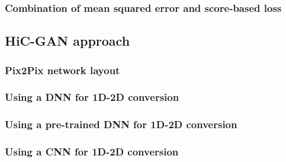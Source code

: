 \subsubsection{Combination of mean squared error and score-based loss} \label{sec:methods:score_loss}


\subsection{HiC-GAN approach}
\subsubsection{Pix2Pix network layout}
\subsubsection{Using a DNN for 1D-2D conversion}
\subsubsection{Using a pre-trained DNN for 1D-2D conversion}
\subsubsection{Using a CNN for 1D-2D conversion}








